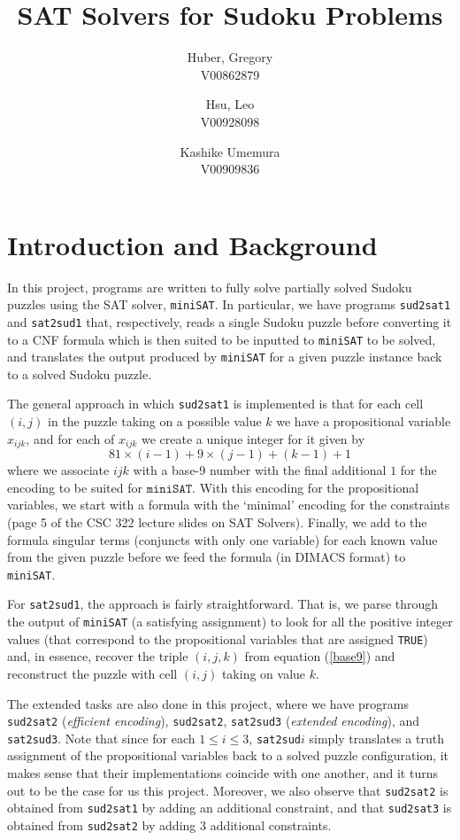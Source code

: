 \documentclass[12pt]{article}
\title{SAT Solvers for Sudoku Problems}
\author{
  Huber, Gregory \\
  V00862879
  \and
  Hsu, Leo \\
  V00928098
  \and
  Kashike Umemura \\
  V00909836
}
\begin{document}
\maketitle

\section{Introduction and Background}

\indent In this project, programs are written to fully solve partially solved Sudoku puzzles using the SAT solver, \texttt{miniSAT}. In particular, we have programs \texttt{sud2sat1} and \texttt{sat2sud1} that, respectively, reads a single Sudoku puzzle before converting it to a CNF formula which is then suited to be inputted to \texttt{miniSAT} to be solved, and translates the output produced by \texttt{miniSAT} for a given puzzle instance back to a solved Sudoku puzzle.
\newline

The general approach in which \texttt{sud2sat1} is implemented is that for each cell $(i, j)$ in the puzzle taking on a possible value $k$ we have a propositional variable $x_{ijk}$, and for each of $x_{ijk}$ we create a unique integer for it given by
\begin{equation}\label{base9}
81 \times (i-1) + 9 \times (j-1) + (k-1) + 1
\end{equation}
where we associate $ijk$ with a base-9 number with the final additional $1$ for the encoding to be suited for $\texttt{miniSAT}$. With this encoding for the propositional variables, we start with a formula with the `minimal' encoding for the constraints (page 5 of the CSC 322 lecture slides on SAT Solvers). Finally, we add to the formula singular terms (conjuncts with only one variable) for each known value from the given puzzle before we feed the formula (in DIMACS format) to \texttt{miniSAT}.
\newline

For \texttt{sat2sud1}, the approach is fairly straightforward. That is, we parse through the output of \texttt{miniSAT} (a satisfying assignment) to look for all the positive integer values (that correspond to the propositional variables that are assigned \texttt{TRUE}) and, in essence, recover the triple $(i, j, k)$ from equation (\ref{base9}) and reconstruct the puzzle with cell $(i, j)$ taking on value $k$.
\newline

The extended tasks are also done in this project, where we have programs \texttt{sud2sat2} (\emph{efficient encoding}), \texttt{sud2sat2}, \texttt{sat2sud3} (\emph{extended encoding}), and \texttt{sat2sud3}. Note that since for each $1 \leq i \leq 3$, \texttt{sat2sud}$i$ simply translates a truth assignment of the propositional variables back to a solved puzzle configuration, it makes sense that their implementations coincide with one another, and it turns out to be the case for us this project. Moreover, we also observe that \texttt{sud2sat2} is obtained from \texttt{sud2sat1} by adding an additional constraint, and that \texttt{sud2sat3} is obtained from \texttt{sud2sat2} by adding 3 additional constraints.
\end{document}

